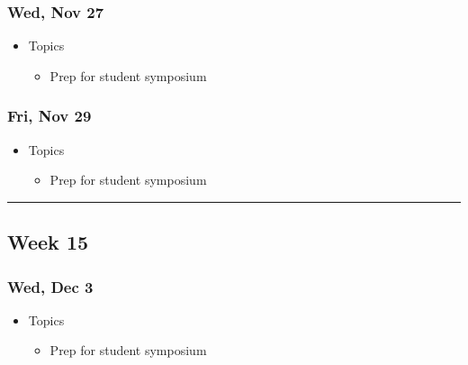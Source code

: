 \documentclass[]{article}
\providecommand{\tightlist}{%
  \setlength{\itemsep}{0pt}\setlength{\parskip}{0pt}}
\begin{document}
\hypertarget{wed-nov-27}{%
\subsubsection{Wed, Nov 27}\label{wed-nov-27}}

\begin{itemize}
\tightlist
\item
  Topics

  \begin{itemize}
  \tightlist
  \item
    Prep for student symposium
  \end{itemize}
\end{itemize}

\hypertarget{fri-nov-29}{%
\subsubsection{Fri, Nov 29}\label{fri-nov-29}}

\begin{itemize}
\tightlist
\item
  Topics

  \begin{itemize}
  \tightlist
  \item
    Prep for student symposium
  \end{itemize}
\end{itemize}

\begin{center}\rule{0.5\linewidth}{\linethickness}\end{center}

\hypertarget{week-15}{%
\subsection{Week 15}\label{week-15}}

\hypertarget{wed-dec-3}{%
\subsubsection{Wed, Dec 3}\label{wed-dec-3}}

\begin{itemize}
\tightlist
\item
  Topics

  \begin{itemize}
  \tightlist
  \item
    Prep for student symposium
  \end{itemize}
\end{itemize}
\end{document}
